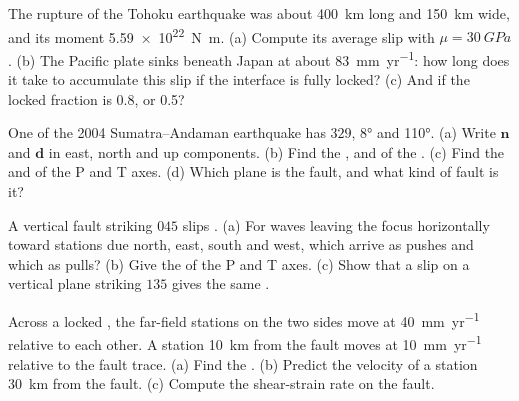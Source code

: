 \begin{exercise}[$\star\star$]\label{exo:b1:earthquake-source:6}
The rupture of the Tohoku earthquake was about \qty{400}{km} long and
\qty{150}{km} wide, and its moment \qty{5.59e22}{N.m}. (a) Compute its
average slip with $\mu = \qty{30}{GPa}$. (b) The Pacific plate sinks beneath
Japan at about \qty{83}{mm.yr^{-1}}: how long does it take to accumulate this
slip if the interface is fully locked? (c) And if the locked fraction is 0.8,
or 0.5?
\end{exercise}

\begin{exercise}[$\star\star$]\label{exo:b1:earthquake-source:7}
One  of the 2004 Sumatra--Andaman earthquake has  $329$, 
\ang{8} and  \ang{110}. (a) Write $\mathbf n$ and $\mathbf d$ in east, north
and up components. (b) Find the ,  and  of the .
(c) Find the  and  of the P and T axes. (d) Which plane is the
fault, and what kind of fault is it?
\end{exercise}

\begin{exercise}[$\star\star$]\label{exo:b1:earthquake-source:8}
A vertical fault striking $045$ slips . (a) For waves leaving the focus
horizontally toward stations due north, east, south and west, which arrive as
pushes and which as pulls? (b) Give the  of the P and T axes. (c) Show
that a  slip on a vertical plane striking $135$ gives the same .
\end{exercise}

\begin{exercise}[$\star\star$]\label{exo:b1:earthquake-source:9}
Across a locked , the far-field stations on the two sides move
at \qty{40}{mm.yr^{-1}} relative to each other. A station \qty{10}{km} from the
fault moves at \qty{10}{mm.yr^{-1}} relative to the fault trace. (a) Find the
. (b) Predict the velocity of a station \qty{30}{km} from the
fault. (c) Compute the shear-strain rate on the fault.
\end{exercise}

